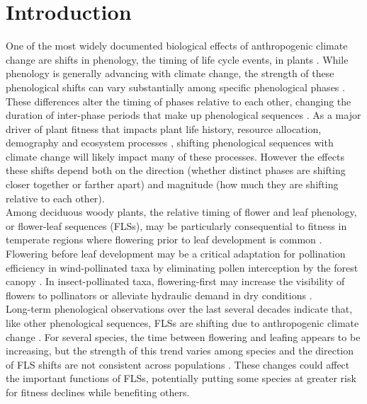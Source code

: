 \documentclass[11pt]{article}\usepackage[]{graphicx}\usepackage[]{color}
\begin{document}
\section*{Introduction}
\noindent One of the most widely documented biological effects of anthropogenic climate change are shifts in phenology, the timing of life cycle events, in plants \citep{Parmesan2003,Menzel2006,Cleland2007}. While phenology is generally advancing with climate change, the strength of these phenological shifts can vary substantially among specific phenological phases \citep{Augspurger:2020aa}. These differences alter the timing of phases relative to each other, changing the duration of inter-phase periods that make up phenological sequences \citep{Ettinger2018}. As a major driver of plant fitness that impacts plant life history, resource allocation, demography and ecosystem processes \citep{Post:2008aa}, shifting phenological sequences with climate change will likely impact many of these processes. However the effects these shifts depend both on the direction (whether distinct phases are shifting closer together or farther apart) and magnitude (how much they are shifting relative to each other).\\ 
\noindent Among deciduous woody plants, the relative timing of flower and leaf phenology, or flower-leaf sequences (FLSs), may be particularly consequential to fitness in temperate regions where flowering prior to leaf development is common \citep{Rathcke_1985,Gougherty2018}. Flowering before leaf development may be a critical adaptation for pollination efficiency in wind-pollinated taxa by eliminating pollen interception by the forest canopy \citep{Whitehead1969}. In insect-pollinated taxa, flowering-first may increase the visibility of flowers to pollinators \citep{Janzen1967,Savage2019} or alleviate hydraulic demand in dry conditions \citep{Gougherty2018, Franklin2016}.\\

\noindent Long-term phenological observations over the last several decades indicate that, like other phenological sequences, FLSs are shifting due to anthropogenic climate change \citep{Buonaiuto2020}. For several species, the time between flowering and leafing appears to be increasing, but the strength of this trend varies among species and the direction of FLS shifts are not consistent across populations \citep{Buonaiuto2020}. These changes could affect the important functions of FLSs, potentially putting some species at greater risk for fitness declines while benefiting others.\\
\end{document}
